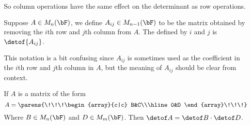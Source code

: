 So column operations have the same effect on the determinant as row operations.

\begin{defn*}

    Suppose $A\in M_n(\bF)$, we define $A_{ij}\in M_{n-1}(\bF)$ to be the matrix obtained by removing the $i$th row and $j$th column from $A$.
    The  defined by $i$ and $j$ is $\detof{A_{ij}}$.

\end{defn*}

This notation is a bit confusing since $A_{ij}$ is sometimes used as the coefficient in the $i$th row and $j$th column in $A$, but the meaning of $A_{ij}$ should be clear from context.

\begin{lemm*}

    If $A$ is a matrix of the form
    \[ A = \parens{\!\!\!\begin{array}{c|c} B&C\\\hline0&D \end{array}\!\!\!} \]
    Where $B\in M_n(\bF)$ and $D\in M_m(\bF)$.
    Then $\detof A=\detof B\cdot\detof D$.

\end{lemm*}

